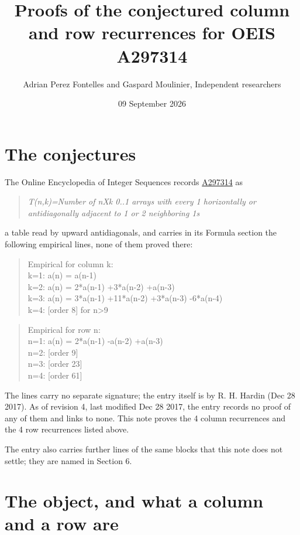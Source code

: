 \documentclass[11pt]{article}
\title{Proofs of the conjectured column and row recurrences for OEIS A297314}
\author{Adrian Perez Fontelles and Gaspard Moulinier, Independent researchers}
\date{09 September 2026}
\theoremstyle{definition}
\begin{document}
\maketitle
\section{The conjectures}

The Online Encyclopedia of Integer Sequences records \href{https://oeis.org/A297314}{A297314} as

\begin{quote}\itshape T(n,k)=Number of nXk 0..1 arrays with every 1 horizontally or antidiagonally adjacent to 1 or 2 neighboring 1s\end{quote}

a table read by upward antidiagonals, and carries in its Formula section the following empirical lines, none of them proved there:

\begin{quote}\ttfamily Empirical for column k:\\
k=1: a(n) = a(n-1)\\k=2: a(n) = 2*a(n-1) +3*a(n-2) +a(n-3)\\k=3: a(n) = 3*a(n-1) +11*a(n-2) +3*a(n-3) -6*a(n-4)\\k=4: [order 8] for n>9\end{quote}

\begin{quote}\ttfamily Empirical for row n:\\
n=1: a(n) = 2*a(n-1) -a(n-2) +a(n-3)\\n=2: [order 9]\\n=3: [order 23]\\n=4: [order 61]\end{quote}

The lines carry no separate signature; the entry itself is by R. H. Hardin (Dec 28 2017). As of revision 4, last modified Dec 28 2017, the entry records no proof of any of them and links to none. This note proves the 4 column recurrences and the 4 row recurrences listed above.

The entry also carries further lines of the same blocks that this note does not settle; they are named in Section 6.

\section{The object, and what a column and a row are}
\end{document}
